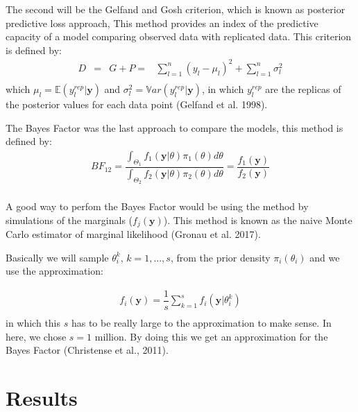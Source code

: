 \documentclass{asaproc}
\begin{document}
The second will be the Gelfand and Gosh criterion, which is known as posterior predictive loss approach, This method provides an index of the predictive capacity of a model comparing observed data with replicated data. This criterion is defined by:
\begin{equation*}
\begin{array}{lclllll}
D & = & G + P = & \displaystyle\sum_{l=1}^{n}(y_l - \mu_l)^2 + \displaystyle\sum_{l=1}^{n} \sigma^2_l\\
\end{array}
\end{equation*} 
\noindent
which $\mu_l = \mathds{E}(y_l^{rep}|\textbf{y})$ and $\sigma_l^2 =  \mathds{V}ar(y_l^{rep}|\textbf{y})$, in which $y_l^{rep}$ are the replicas of the posterior values for each data point (Gelfand et al. 1998).

The Bayes Factor was the last approach to compare the models, this method is defined by:
\begin{equation*}
\begin{array}{lclll}
BF_{12} = \dfrac{ \int_{\Theta_1} f_1(\textbf{y}|\theta) \pi_1(\theta) d\theta}{\int_{\Theta_2} f_2(\textbf{y}|\theta) \pi_2(\theta) d\theta} = \dfrac{f_1(\textbf{y})}{f_2(\textbf{y})} \\
\end{array}
\end{equation*}
\noindent

A good way to perfom the Bayes Factor would be using the method by simulations of the marginals ($f_j(\textbf{y})$). This method is known as the naive Monte Carlo estimator of marginal likelihood (Gronau et al. 2017).

Basically we will sample $\theta_i^k$, $k=1,...,s$, from the prior density $\pi_i(\theta_i)$ and we use the approximation:

\begin{equation*}
\begin{array}{lclll}
f_i(\textbf{y}) = \dfrac{1}{s} \displaystyle\sum_{k=1}^{s} f_i(\textbf{y}|\theta_i^k) \\
\end{array}
\end{equation*}
\noindent
in which this $s$ has to be really large to the approximation to make sense. In here, we chose $s= 1$ million. By doing this we get an approximation for the Bayes Factor (Christense et al., 2011).  

\section{Results}
\end{document}

